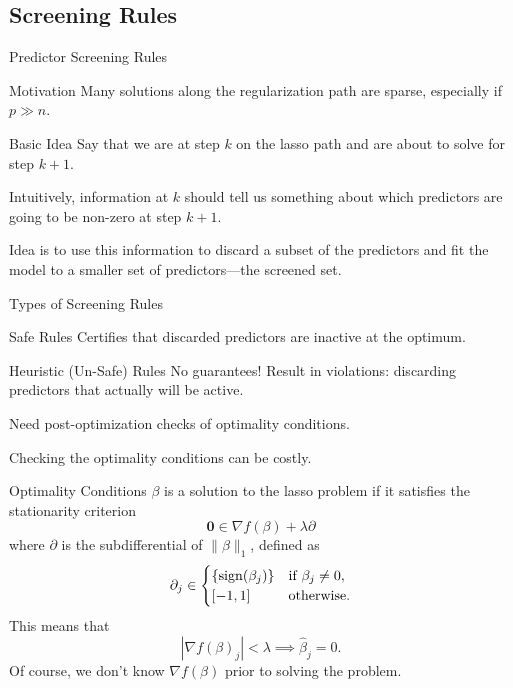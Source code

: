 \subsection{Screening Rules}

\begin{frame}{Predictor Screening Rules}
  \begin{block}{Motivation}
    Many solutions along the regularization path are \alert{sparse}, 
    especially if \(p \gg n\).
  \end{block}

  \pause

  \begin{block}{Basic Idea}
    Say that we are at step \(k\) on the lasso path and are about to solve for
    step \(k + 1\). \medskip

    Intuitively, information at \(k\) should tell us something
    about which predictors are going to be non-zero at step \(k + 1\). \medskip

    Idea is to use this information to \alert{discard} a subset of the
    predictors and fit the model to a smaller set of predictors---the screened
    set.
  \end{block}
\end{frame}

\begin{frame}{Types of Screening Rules}
  \begin{block}{Safe Rules}
    Certifies that discarded predictors are inactive at the optimum.
  \end{block}
  \pause
  \begin{block}{Heuristic (Un-Safe) Rules}
    No guarantees! Result in \alert{violations}: discarding predictors that
    actually will be active. \medskip

    Need post-optimization checks of optimality
    conditions. \medskip

    Checking the optimality conditions can be costly.
  \end{block}
\end{frame}

\begin{frame}{Optimality Conditions}
  \(\beta\) is a solution to the lasso problem if it satisfies the stationarity
  criterion
  \[
    \boldsymbol{0} \in \nabla f(\beta) + \lambda \partial
  \]
  where \(\partial\) is the subdifferential of \(\lVert \beta \rVert_1\),
  defined as
  \[
    \partial_j \in
    \begin{cases}
      \{\operatorname{sign}(\beta_j)\} & \text{if } \beta_j \neq 0, \\
      [-1,1]             & \text{otherwise.}
    \end{cases}
  \]
  \pause
  This means that
  \[
    |\nabla f(\beta)_j| < \lambda \implies \hat\beta_j = 0.
  \]
  Of course, we don't know \(\nabla f(\beta)\) prior to solving the problem.

\end{frame}

